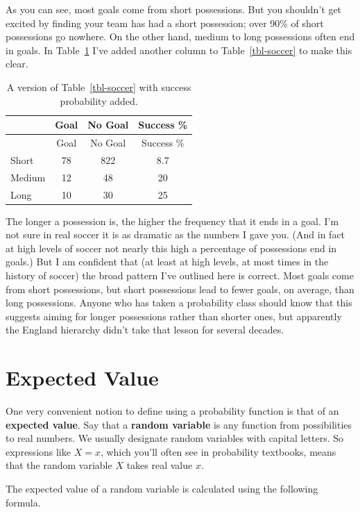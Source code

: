 \documentclass[
  11pt,
  letterpaper,
]{scrbook}
\begin{document}
As you can see, most goals come from short possessions. But you
shouldn't get excited by finding your team has had a short possession;
over 90\% of short possessions go nowhere. On the other hand, medium to
long possessions often end in goals. In Table~\ref{tbl-soccer-percent}
I've added another column to Table~\ref{tbl-soccer} to make this clear.

\begin{longtable}[]{@{}lccc@{}}
\caption{A version of Table~\ref{tbl-soccer} with success probability
added.}\label{tbl-soccer-percent}\tabularnewline
\toprule\noalign{}
& Goal & No Goal & Success \% \\
\midrule\noalign{}
\endfirsthead
\toprule\noalign{}
& Goal & No Goal & Success \% \\
\midrule\noalign{}
\endhead
\bottomrule\noalign{}
\endlastfoot
Short & 78 & 822 & 8.7 \\
Medium & 12 & 48 & 20 \\
Long & 10 & 30 & 25 \\
\end{longtable}

The longer a possession is, the higher the frequency that it ends in a
goal. I'm not sure in real soccer it is as dramatic as the numbers I
gave you. (And in fact at high levels of soccer not nearly this high a
percentage of possessions end in goals.) But I am confident that (at
least at high levels, at most times in the history of soccer) the broad
pattern I've outlined here is correct. Most goals come from short
possessions, but short possessions lead to fewer goals, on average, than
long possessions. Anyone who has taken a probability class should know
that this suggests aiming for longer possessions rather than shorter
ones, but apparently the England hierarchy didn't take that lesson for
several decades.

\section{Expected Value}\label{sec-expected-value}

One very convenient notion to define using a probability function is
that of an \textbf{expected value}. Say that a \textbf{random variable}
is any function from possibilities to real numbers. We usually designate
random variables with capital letters. So expressions like \(X=x\),
which you'll often see in probability textbooks, means that the random
variable \(X\) takes real value \(x\).

The expected value of a random variable is calculated using the
following formula.
\end{document}
